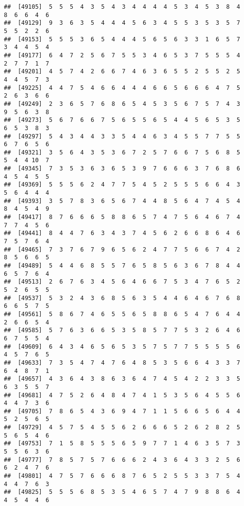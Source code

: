 \documentclass[
]{book}
\begin{document}
\begin{verbatim}
##  [49105]  5  5  5  4  3  5  4  3  4  4  4  4  5  3  4  5  3  8  4  8  6  6  4  6
##  [49129]  9  3  6  3  5  4  4  4  5  6  3  4  5  5  3  5  3  5  7  5  5  2  2  6
##  [49153]  5  5  5  3  6  5  4  4  4  5  6  5  6  3  3  1  6  5  7  3  4  4  5  4
##  [49177]  6  4  7  2  5  6  7  5  5  3  4  6  5  3  7  5  5  5  4  2  7  7  1  7
##  [49201]  4  5  7  4  2  6  6  7  4  6  3  6  5  5  2  5  5  2  5  4  4  5  7  3
##  [49225]  4  4  7  5  4  6  6  4  4  4  6  6  5  6  6  6  4  7  5  2  6  3  6  6
##  [49249]  2  3  6  5  7  6  8  6  5  4  5  3  5  6  7  5  7  4  3  9  5  6  3  8
##  [49273]  5  6  7  6  6  7  5  6  5  5  6  5  4  4  5  6  5  3  5  6  5  3  8  3
##  [49297]  5  4  3  4  4  3  3  5  4  4  6  3  4  5  5  7  7  5  5  6  7  6  5  6
##  [49321]  3  5  6  4  3  5  3  6  7  2  5  7  6  6  7  5  6  8  5  5  4  4 10  7
##  [49345]  7  3  5  3  6  3  6  5  3  9  7  6  6  6  3  7  6  8  6  4  5  4  5  5
##  [49369]  5  5  5  6  2  4  7  7  5  4  5  2  5  5  5  6  6  4  3  5  6  4  4  4
##  [49393]  3  5  7  8  3  6  5  6  7  4  4  8  5  6  4  7  4  5  4  8  4  5  4  9
##  [49417]  8  7  6  6  6  5  8  8  6  5  7  4  7  5  6  4  6  7  4  7  7  4  5  6
##  [49441]  8  4  4  7  6  3  4  3  7  4  5  6  2  6  6  8  6  4  6  7  5  7  6  4
##  [49465]  7  3  7  6  7  9  6  5  6  2  4  7  7  5  6  6  7  4  2  8  5  6  6  5
##  [49489]  5  4  4  6  8  5  5  7  6  5  8  5  6  3  6  7  8  4  4  6  5  7  6  4
##  [49513]  2  6  7  6  3  4  5  6  4  6  6  7  5  3  4  7  6  5  2  5  2  6  5  5
##  [49537]  5  3  2  4  3  6  8  5  6  3  5  4  4  6  4  6  7  6  8  6  6  5  7  5
##  [49561]  5  8  6  7  4  6  5  5  6  5  8  8  6  5  4  7  6  4  4  2  6  6  5  4
##  [49585]  5  7  6  3  6  6  5  3  5  8  5  7  7  5  3  2  6  4  6  6  7  5  5  4
##  [49609]  6  4  3  4  6  5  6  5  3  5  7  5  7  7  5  5  5  5  6  4  5  7  6  5
##  [49633]  7  3  5  4  7  4  7  6  4  8  5  3  5  6  6  4  3  3  7  6  4  8  7  1
##  [49657]  4  3  6  4  3  8  6  3  6  4  7  4  5  4  2  2  3  3  5  6  3  5  5  7
##  [49681]  4  7  5  2  6  4  8  4  7  4  1  5  3  5  6  4  5  5  6  4  4  7  3  6
##  [49705]  7  8  6  5  4  3  6  9  4  7  1  1  5  6  6  5  6  4  4  5  2  5  6  5
##  [49729]  4  5  7  5  4  5  5  6  2  6  6  6  5  2  6  2  8  2  5  5  6  5  4  6
##  [49753]  7  1  5  8  5  5  5  6  5  9  7  7  1  4  6  3  5  7  3  5  5  6  3  6
##  [49777]  7  8  5  7  5  7  6  6  6  2  4  3  6  4  3  3  2  5  6  6  2  4  7  6
##  [49801]  4  7  5  7  6  6  6  8  7  6  5  2  5  5  3  3  7  5  4  4  4  7  6  3
##  [49825]  5  5  5  6  8  5  3  5  4  6  5  7  4  7  9  8  8  6  4  4  5  4  4  6

\end{verbatim}
\end{document}

